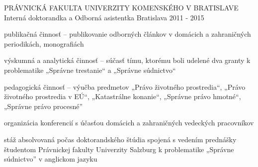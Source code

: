 \begin{cventries}
  \cventry
    {PRÁVNICKÁ FAKULTA UNIVERZITY KOMENSKÉHO V BRATISLAVE} %
    {Interná doktorandka a Odborná asistentka} %
    {Bratislava} %
    {2011 - 2015} %
    {
      \begin{cvitems} %
        \item {publikačná činnosť – publikovanie odborných článkov v domácich a zahraničných periodikách, monografiách}
        \item {výskumná a analytická činnosť – súčasť tímu, ktorému boli udelené dva granty k problematike „Správne trestanie“ a „Správne súdnictvo“}
        \item {pedagogická činnosť – výučba predmetov „Právo životného prostredia“, „Právo životného prostredia v EÚ“, „Katastrálne konanie“, „Správne právo hmotné“, „Správne právo procesné”}
        \item {organizácia konferencií s účasťou domácich a zahraničných vedeckých pracovníkov}
        \item {stáž absolvovaná počas doktorandského štúdia spojená s vedením prednášky študentom Právnickej fakulty Univerzity Salzburg k problematike „Správne súdnictvo” v anglickom jazyku}
      \end{cvitems}
    }

\end{cventries}
